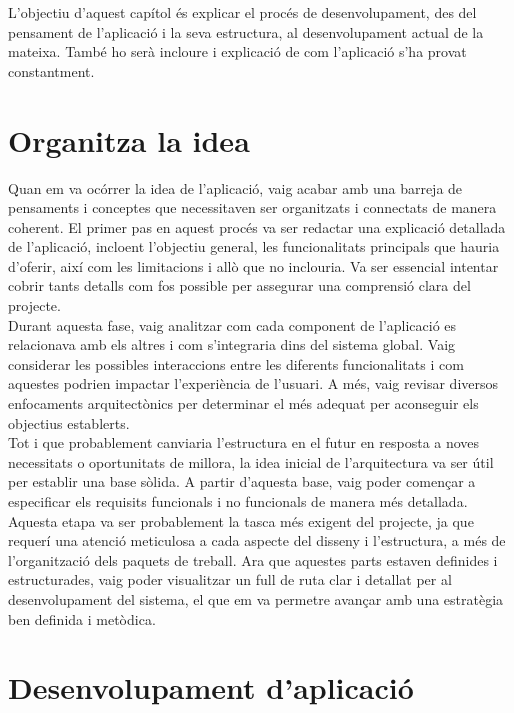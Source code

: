 \documentclass[a4paper,12pt,twoside]{ThesisStyle}
\begin{document}
L'objectiu d'aquest capítol és explicar el procés de desenvolupament, des del pensament
de l'aplicació i la seva estructura, al desenvolupament actual de la mateixa. També ho serà
incloure i explicació de com l'aplicació s'ha provat constantment.


\section{Organitza la idea}
\label{sec: Organitza la idea}

Quan em va ocórrer la idea de l'aplicació, vaig acabar amb una barreja de pensaments i conceptes que necessitaven ser organitzats i connectats de manera coherent. El primer pas en aquest procés va ser redactar una explicació detallada de l'aplicació, incloent l'objectiu general, les funcionalitats principals que hauria d'oferir, així com les limitacions i allò que no inclouria. Va ser essencial intentar cobrir tants detalls com fos possible per assegurar una comprensió clara del projecte.\\

Durant aquesta fase, vaig analitzar com cada component de l'aplicació es relacionava amb els altres i com s'integraria dins del sistema global. Vaig considerar les possibles interaccions entre les diferents funcionalitats i com aquestes podrien impactar l'experiència de l'usuari. A més, vaig revisar diversos enfocaments arquitectònics per determinar el més adequat per aconseguir els objectius establerts.\\

Tot i que probablement canviaria l'estructura en el futur en resposta a noves necessitats o oportunitats de millora, la idea inicial de l'arquitectura va ser útil per establir una base sòlida. A partir d'aquesta base, vaig poder començar a especificar els requisits funcionals i no funcionals de manera més detallada. Aquesta etapa va ser probablement la tasca més exigent del projecte, ja que requerí una atenció meticulosa a cada aspecte del disseny i l'estructura, a més de l'organització dels paquets de treball. Ara que aquestes parts estaven definides i estructurades, vaig poder visualitzar un full de ruta clar i detallat per al desenvolupament del sistema, el que em va permetre avançar amb una estratègia ben definida i metòdica.



\section{Desenvolupament d'aplicació}
\label{sec: Desenvolupament d'aplicació}
\end{document}
